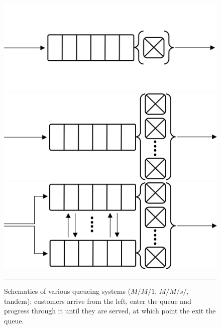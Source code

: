\begin{figure}[!t]
\centering
\includegraphics[width=\textwidth]{Images/MM12.png}
\includegraphics[width=\textwidth]{Images/MMc.png}
\includegraphics[width=\textwidth]{Images/Tandem.png}
\caption{\small Schematics of various queueing systems ($M/M/1$, $M/M/s/$, tandem); customers arrive from the left, enter the queue and progress through it until they are served, at which point the exit the queue.}\label{fig:MM}\hrule
\end{figure}\afterpage{\FloatBarrier}
